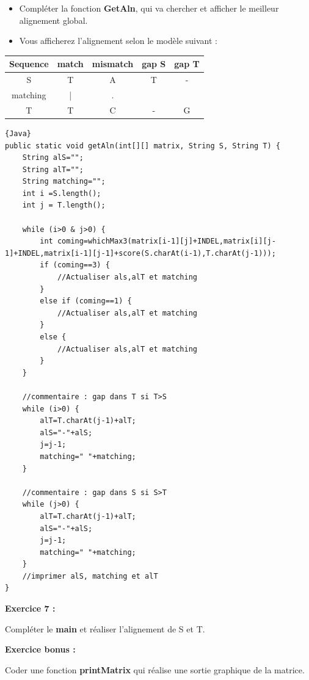 \documentclass{article}
\begin{document}
\begin{itemize}
\item Compléter la fonction \textbf{GetAln}, qui va chercher et afficher le meilleur alignement global.
\item Vous afficherez l'alignement selon le modèle suivant : \\
\end{itemize}
\begin{center}
\begin{tabular}{|c|c|c|c|c|}
\hline
Sequence&match&mismatch&gap S&gap T\\
\hline
S&T&A&T&-\\
\hline
matching&|&.& & \\
\hline
T&T&C&-&G\\
\hline
\end{tabular}
    \end{center}

\begin{lstlisting}{Java}
public static void getAln(int[][] matrix, String S, String T) {
	String alS="";
	String alT="";
	String matching="";
	int i =S.length();
	int j = T.length();
	
	while (i>0 & j>0) {
		int coming=whichMax3(matrix[i-1][j]+INDEL,matrix[i][j-1]+INDEL,matrix[i-1][j-1]+score(S.charAt(i-1),T.charAt(j-1)));
		if (coming==3) {
            //Actualiser als,alT et matching
		}
		else if (coming==1) {
    		//Actualiser als,alT et matching
		}
		else {
    		//Actualiser als,alT et matching
		}
	}
	
    //commentaire : gap dans T si T>S
	while (i>0) {
		alT=T.charAt(j-1)+alT;
		alS="-"+alS;
		j=j-1;
		matching=" "+matching;
	}
	
    //commentaire : gap dans S si S>T
	while (j>0) {
		alT=T.charAt(j-1)+alT;
		alS="-"+alS;
		j=j-1;
		matching=" "+matching;
	}
	//imprimer alS, matching et alT
}
\end{lstlisting}

\textbf{Exercice 7 :} 

Compléter le \textbf{main} et réaliser l'alignement de S et T.

\textbf{Exercice bonus :} 

Coder une fonction \textbf{printMatrix} qui réalise une sortie graphique de la matrice.

 
\end{document}
